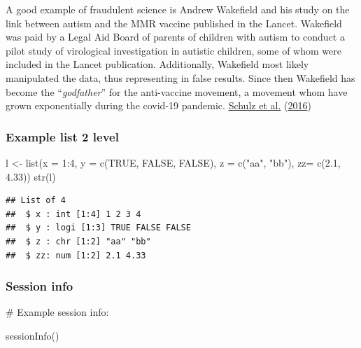 \documentclass[
  12pt,
  norsk,
]{article}
\newenvironment{Shaded}{\begin{snugshade}}{\end{snugshade}}
\newcommand{\AttributeTok}[1]{\textcolor[rgb]{0.77,0.63,0.00}{#1}}
\newcommand{\ConstantTok}[1]{\textcolor[rgb]{0.00,0.00,0.00}{#1}}
\newcommand{\DecValTok}[1]{\textcolor[rgb]{0.00,0.00,0.81}{#1}}
\newcommand{\FloatTok}[1]{\textcolor[rgb]{0.00,0.00,0.81}{#1}}
\newcommand{\FunctionTok}[1]{\textcolor[rgb]{0.00,0.00,0.00}{#1}}
\newcommand{\NormalTok}[1]{#1}
\newcommand{\OtherTok}[1]{\textcolor[rgb]{0.56,0.35,0.01}{#1}}
\newcommand{\SpecialCharTok}[1]{\textcolor[rgb]{0.00,0.00,0.00}{#1}}
\newcommand{\StringTok}[1]{\textcolor[rgb]{0.31,0.60,0.02}{#1}}
\begin{document}
A good example of fraudulent science is Andrew Wakefield and his study
on the link between autism and the MMR vaccine published in the Lancet.
Wakefield was paid by a Legal Aid Board of parents of children with
autism to conduct a pilot study of virological investigation in autistic
children, some of whom were included in the Lancet publication.
Additionally, Wakefield most likely manipulated the data, thus
representing in false results. Since then Wakefield has become the
``\emph{godfather}'' for the anti-vaccine movement, a movement whom have
grown exponentially during the covid-19 pandemic.
\protect\hyperlink{ref-schulz2016}{Schulz et al.}
(\protect\hyperlink{ref-schulz2016}{2016})

\hypertarget{example-list-2-level}{%
\subsubsection{Example list 2 level}\label{example-list-2-level}}

\begin{Shaded}
\begin{Highlighting}[]
\NormalTok{l }\OtherTok{\textless{}{-}} \FunctionTok{list}\NormalTok{(}\AttributeTok{x =} \DecValTok{1}\SpecialCharTok{:}\DecValTok{4}\NormalTok{, }\AttributeTok{y =} \FunctionTok{c}\NormalTok{(}\ConstantTok{TRUE}\NormalTok{, }\ConstantTok{FALSE}\NormalTok{, }\ConstantTok{FALSE}\NormalTok{), }\AttributeTok{z =} \FunctionTok{c}\NormalTok{(}\StringTok{"aa"}\NormalTok{, }\StringTok{"bb"}\NormalTok{), }\AttributeTok{zz=} \FunctionTok{c}\NormalTok{(}\FloatTok{2.1}\NormalTok{, }\FloatTok{4.33}\NormalTok{))}
\FunctionTok{str}\NormalTok{(l)}
\end{Highlighting}
\end{Shaded}

\begin{verbatim}
## List of 4
##  $ x : int [1:4] 1 2 3 4
##  $ y : logi [1:3] TRUE FALSE FALSE
##  $ z : chr [1:2] "aa" "bb"
##  $ zz: num [1:2] 2.1 4.33
\end{verbatim}

\hypertarget{session-info}{%
\subsubsection{Session info}\label{session-info}}

\# Example session info:

\begin{Shaded}
\begin{Highlighting}[]
\FunctionTok{sessionInfo}\NormalTok{()}
\end{Highlighting}
\end{Shaded}
\end{document}
